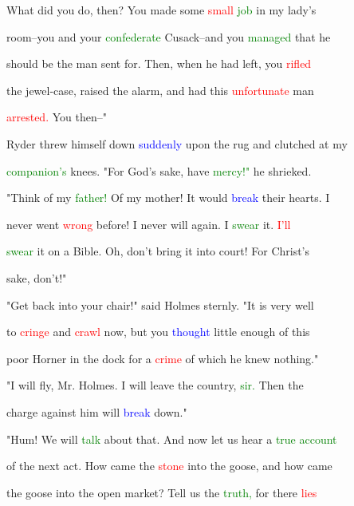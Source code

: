  What did you do, then? You made some \textcolor{red}{small} \textcolor{green}{job} in my lady's

 room--you and your \textcolor{green}{confederate} Cusack--and you \textcolor{green}{managed} that he

 should be the man sent for. Then, when he had left, you \textcolor{red}{rifled}

 the jewel-case, raised the \textcolor{BurntOrange}{alarm,} and had this \textcolor{red}{unfortunate} man

 \textcolor{red}{arrested.} You then--"



 Ryder threw himself down \textcolor{blue}{suddenly} upon the rug and clutched at my

 \textcolor{green}{companion's} knees. "For \textcolor{BurntOrange}{God's} sake, have \textcolor{green}{mercy!"} he \textcolor{BurntOrange}{shrieked.}

 "Think of my \textcolor{green}{father!} Of my \textcolor{BurntOrange}{mother!} It would \textcolor{blue}{break} their hearts. I

 never went \textcolor{red}{wrong} before! I never will again. I \textcolor{green}{swear} it. \textcolor{red}{I'll}

 \textcolor{green}{swear} it on a Bible. Oh, don't bring it into \textcolor{BurntOrange}{court!} For Christ's

 sake, don't!"



 "Get back into your chair!" said Holmes sternly. "It is very well

 to \textcolor{red}{cringe} and \textcolor{red}{crawl} now, but you \textcolor{blue}{thought} little enough of this

 poor Horner in the dock for a \textcolor{red}{crime} of which he knew nothing."



 "I will fly, Mr. Holmes. I will \textcolor{BurntOrange}{leave} the country, \textcolor{green}{sir.} Then the

 charge against him will \textcolor{blue}{break} down."



 "Hum! We will \textcolor{green}{talk} about that. And now let us hear a \textcolor{green}{true} \textcolor{green}{account}

 of the next act. How came the \textcolor{red}{stone} into the goose, and how came

 the goose into the open market? Tell us the \textcolor{green}{truth,} for there \textcolor{red}{lies}


